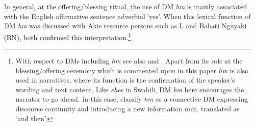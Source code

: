 \documentclass[output=paper,colorlinks,citecolor=brown]{langscibook}
\begin{document}
In general, at the offering/blessing ritual, the use of DM \textit{hm} is mainly associated  with the English affirmative sentence adverbial ‘yes’. When this lexical function of DM \textit{hm} was discussed with Akie resource persons such as L and Bahati Nguyaki (BN), both confirmed  this interpretation.\footnote{With respect to DMs including \textit{hm} see also \citet{HeineEtAl2017} and \citet[137--146]{KonigEtAl2015}. Apart from its role at the blessing/offering ceremony which is commented upon in this paper \textit{hm} is also used in narratives, where its function is the confirmation of the speaker’s wording and text content. Like \textit{ehee} in Swahili, DM \textit{hm} here encourages the narrator to go ahead. In this case, \citet[152]{HeineEtAl2017}  classify \textit{hm} as a connective DM expressing discourse continuity and introducing a new information unit, translated as ‘and then’.}\pagebreak

\end{document}

